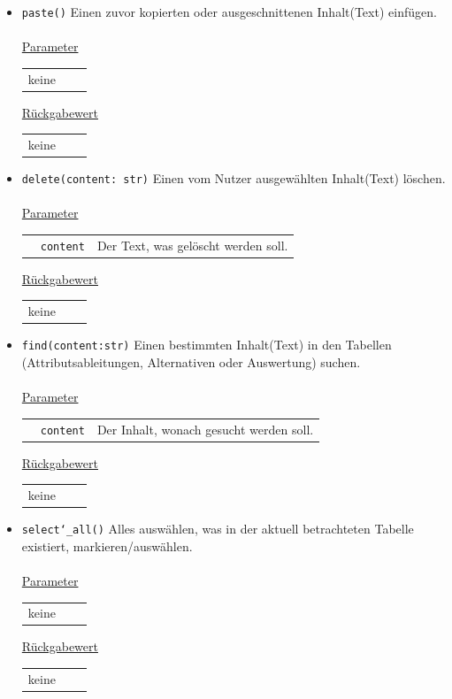 \documentclass{article}
\begin{document}
\begin{itemize}
\item \texttt{paste()} \newline Einen zuvor kopierten oder ausgeschnittenen Inhalt(Text) einfügen.
\\\\
\underline{{Parameter}} 
\begin{tabular}{lll}
keine
\end{tabular}

\underline{{Rückgabewert}}
\begin{tabular}{lll}
keine
\end{tabular}

\item \texttt{delete(content: str)} \newline Einen vom Nutzer ausgewählten Inhalt(Text) löschen.
\\\\
\underline{{Parameter}} 
\begin{tabular}{lll}
& \texttt{content} & Der Text, was gelöscht werden soll. \\
\end{tabular}

\underline{{Rückgabewert}}
\begin{tabular}{lll}
keine
\end{tabular}

\item \texttt{find(content:str)} \newline Einen bestimmten Inhalt(Text) in den Tabellen (Attributsableitungen, Alternativen oder Auswertung) suchen.
\\\\
\underline{{Parameter}} 
\begin{tabular}{lll}
 & \texttt{content} & Der Inhalt, wonach gesucht werden soll. \\
\end{tabular}

\underline{{Rückgabewert}}
\begin{tabular}{lll}
 keine
\end{tabular}

\item \texttt{select\char`_all()} \newline Alles auswählen, was in der aktuell betrachteten Tabelle existiert, markieren/auswählen.
\\\\
\underline{{Parameter}} 
\begin{tabular}{lll}
keine
\end{tabular}

\underline{{Rückgabewert}}
\begin{tabular}{lll}
 keine
\end{tabular}
\end{itemize}
\end{document}
